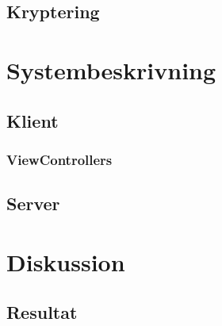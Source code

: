 \documentclass[10pt, titlepage, oneside, a4paper]{article}
\begin{document}
    	\subsection{Kryptering}
    	
    \section{Systembeskrivning}
    	\subsection{Klient}
    		\subsubsection{ViewControllers}
    		
    	\subsection{Server}
    		
   
   	

    \newpage
    \section{Diskussion}
    	\subsection{Resultat}
    	
\end{document}
